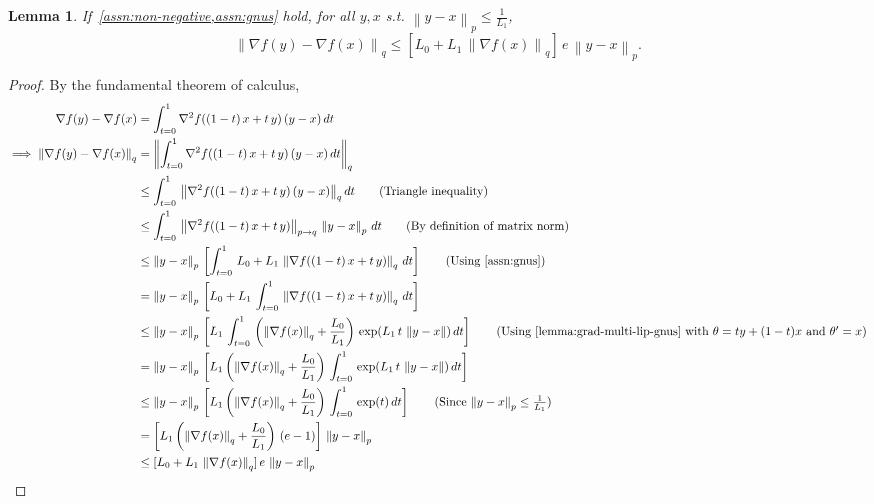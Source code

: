 \documentclass{article}
\newtheorem{lemma}{Lemma}
\newcommand{\norm}[1]{\left\|#1 \right\|}
\begin{document}
\begin{lemma}
If~\cref{assn:non-negative,assn:gnus} hold, for all $y,x$ s.t. $\norm{y - x}_p \leq \frac{1}{L_1}$, 
\[
\norm{\nabla f(y) - \nabla f(x)}_{q} \leq [L_0 + L_1 \, \norm{\nabla f(x)}_q ] \, e \, \norm{y - x}_p.
\]
\label{lemma:grad-lip-gnus}
\end{lemma}
\begin{proof}
By the fundamental theorem of calculus, 
\begin{align*}
\nabla f(y) - \nabla f(x) & = \int_{t = 0}^{1} \nabla^2 f((1-t) \, x + t \, y) \, (y - x) \, dt \\
\implies \norm{\nabla f(y) - \nabla f(x)}_q & = \norm{\int_{t = 0}^{1} \nabla^2 f((1-t) \, x + t \, y) \, (y - x) \, dt}_q \\
& \leq \int_{t = 0}^{1} \, \norm{\nabla^2 f((1-t) \, x + t \, y) \, (y - x)}_{q} dt \tag{Triangle inequality} \\
& \leq \int_{t = 0}^{1} \, \norm{\nabla^2 f((1-t) \, x + t \, y)}_{p \to q} \, \norm{y - x}_p \, dt \tag{By definition of matrix norm} \\
& \leq \norm{y - x}_p \, \left[\int_{t = 0}^{1} \, L_0 + L_1 \, \norm{\nabla f((1-t) \, x + t \, y)}_q \, dt \right] \tag{Using~\cref{assn:gnus}}\\
& = \norm{y - x}_p \, \left[L_0 + L_1 \, \int_{t = 0}^{1} \, \norm{\nabla f((1-t) \, x + t \, y)}_q \, dt \right] \\
& \leq \norm{y - x}_p \, \left[ L_1 \, \int_{t = 0}^{1} \, \left(\norm{\nabla f(x)}_q + \frac{L_0}{L_1}\right)\, \exp(L_1 \, t \, \norm{y - x}) \, dt \right] \tag{Using~\cref{lemma:grad-multi-lip-gnus} with $\theta = ty + (1-t)x$ and $\theta' = x$} \\
& = \norm{y - x}_p \, \left[L_1 \left(\norm{\nabla f(x)}_q + \frac{L_0}{L_1} \right) \, \int_{t = 0}^{1} \, \exp(L_1 \, t \, \norm{y - x}) \, dt \right]  \\
& \leq \norm{y - x}_p \, \left[L_1 \left(\norm{\nabla f(x)}_q + \frac{L_0}{L_1} \right) \, \int_{t = 0}^{1} \, \exp(t) \, dt \right]  \tag{Since $\norm{y - x}_p \leq \frac{1}{L_1}$} \\
& = \left[L_1 \left(\norm{\nabla f(x)}_q + \frac{L_0}{L_1} \right) \, (e-1) \right]\, \norm{y - x}_p \\
& \leq [L_0 + L_1 \, \norm{\nabla f(x)}_q] \,  e \, \norm{y - x}_p 
\end{align*}
\end{proof}
\end{document}
